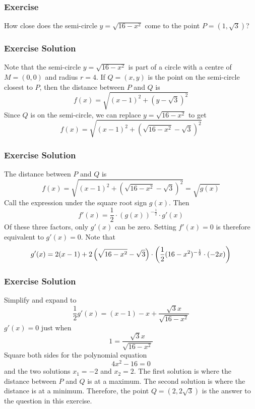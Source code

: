 \documentclass[xcolor=dvipsnames]{beamer}
\begin{document}
\begin{frame}
  \frametitle{Exercise}
  {\ubung} How close does the semi-circle $y=\sqrt{16-x^{2}}$ come to
  the point $P=(1,\sqrt{3})$?
\end{frame}

\begin{frame}
  \frametitle{Exercise Solution}
  Note that the semi-circle $y=\sqrt{16-x^{2}}$ is part of a circle
  with a centre of $M=(0,0)$ and radius $r=4$. If $Q=(x,y)$ is the
  point on the semi-circle closest to $P$, then the distance between
  $P$ and $Q$ is
\begin{equation}
  \label{eq:aziobaeg}
  f(x)=\sqrt{(x-1)^{2}+(y-\sqrt{3})^{2}}
\end{equation}
Since $Q$ is on the semi-circle, we can replace $y=\sqrt{16-x^{2}}$ to
get 
\begin{equation}
  \label{eq:shahquua}
  f(x)=\sqrt{(x-1)^{2}+(\sqrt{16-x^{2}}-\sqrt{3})^{2}}
\end{equation}
\end{frame}

\begin{frame}
  \frametitle{Exercise Solution}
  The distance between $P$ and $Q$ is
\begin{equation}
  \label{eq:ohghoote}
  f(x)=\sqrt{(x-1)^{2}+(\sqrt{16-x^{2}}-\sqrt{3})^{2}}=\sqrt{g(x)}
\end{equation}
Call the expression under the square root sign $g(x)$. Then
\begin{equation}
  \label{eq:ouwophai}
  f'(x)=\frac{1}{2}\cdot\left(g(x)\right)^{-\frac{1}{2}}\cdot{}g'(x)
\end{equation}
Of these three factors, only $g'(x)$ can be zero. Setting $f'(x)=0$ is
therefore equivalent to $g'(x)=0$. Note that
\begin{equation}
  \label{eq:poqueebo}
  g'(x)=2(x-1)+2\left(\sqrt{16-x^{2}}-\sqrt{3}\right)\cdot\left(\frac{1}{2}(16-x^{2})^{-\frac{1}{2}}\cdot(-2x)\right)\notag
\end{equation}
\end{frame}

\begin{frame}
  \frametitle{Exercise Solution}
Simplify and expand to
\begin{equation}
  \label{eq:deiquoot}
  \frac{1}{2}g'(x)=(x-1)-x+\frac{\sqrt{3}x}{\sqrt{16-x^{2}}}
\end{equation}
$g'(x)=0$ just when
\begin{equation}
  \label{eq:xoonahju}
  1=\frac{\sqrt{3}x}{\sqrt{16-x^{2}}}
\end{equation}
Square both sides for the polynomial equation
\begin{equation}
  \label{eq:uabaevoo}
4x^{2}-16=0
\end{equation}
and the two solutions $x_{1}=-2$ and $x_{2}=2$. The first solution is
where the distance between $P$ and $Q$ is at a maximum. The second
solution is where the distance is at a minimum. Therefore, the point
$Q=(2,2\sqrt{3})$ is the answer to the question in this exercise.
\end{frame}
\end{document}
